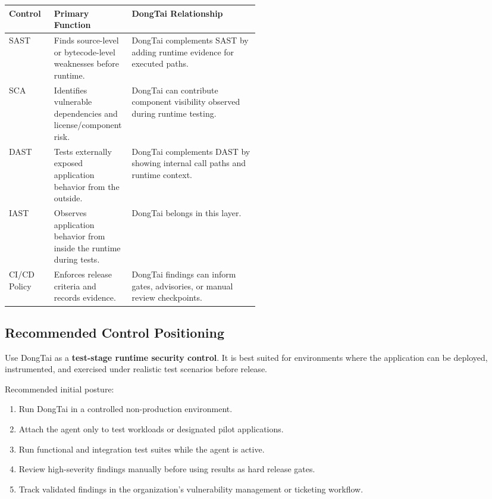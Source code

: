 \documentclass[11pt]{article}
\newcommand{\keyterm}[1]{\textbf{\color{HeadingBlue}#1}}
\begin{document}
\begin{center}
\begin{tabularx}{\linewidth}{L{0.18\linewidth}L{0.31\linewidth}Y}
\toprule
\textbf{Control} & \textbf{Primary Function} & \textbf{DongTai Relationship} \\
\midrule
SAST & Finds source-level or bytecode-level weaknesses before runtime. & DongTai complements SAST by adding runtime evidence for executed paths. \\
SCA & Identifies vulnerable dependencies and license/component risk. & DongTai can contribute component visibility observed during runtime testing. \\
DAST & Tests externally exposed application behavior from the outside. & DongTai complements DAST by showing internal call paths and runtime context. \\
IAST & Observes application behavior from inside the runtime during tests. & DongTai belongs in this layer. \\
CI/CD Policy & Enforces release criteria and records evidence. & DongTai findings can inform gates, advisories, or manual review checkpoints. \\
\bottomrule
\end{tabularx}
\end{center}

\subsection{Recommended Control Positioning}

Use DongTai as a \keyterm{test-stage runtime security control}. It is best suited for environments where the application can be deployed, instrumented, and exercised under realistic test scenarios before release.

Recommended initial posture:
\begin{enumerate}
  \item Run DongTai in a controlled non-production environment.
  \item Attach the agent only to test workloads or designated pilot applications.
  \item Run functional and integration test suites while the agent is active.
  \item Review high-severity findings manually before using results as hard release gates.
  \item Track validated findings in the organization's vulnerability management or ticketing workflow.
\end{enumerate}
\end{document}
